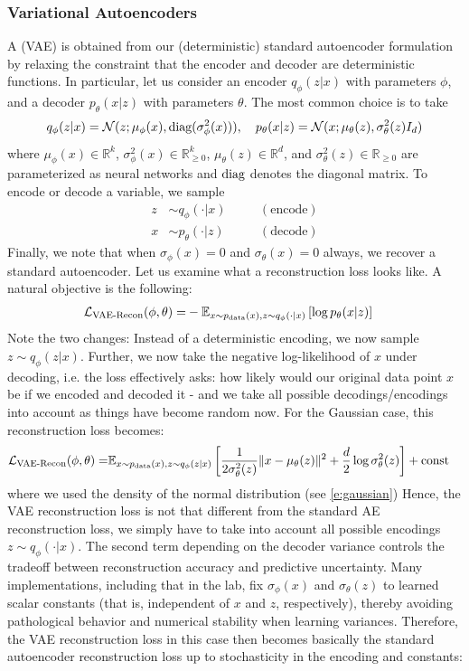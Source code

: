 \subsubsection{Variational Autoencoders} A  (VAE) is obtained from our (deterministic) standard autoencoder formulation by relaxing the constraint that the encoder and decoder are deterministic functions. In particular, let us consider an encoder $q_\phi(z|x)$ with parameters $\phi$, and a decoder $p_\theta(x|z)$ with parameters $\theta$. The most common choice is to take 
\begin{align}
\label{eq:normal_vae}
q_\phi(z|x)=\mathcal{N}(z;\mu_\phi(x),\textrm{diag}(\sigma_\phi^2(x))),\quad p_\theta(x|z)=\mathcal{N}(x;\mu_\theta(z),\sigma_\theta^2(z)I_d)
\end{align}
where $\mu_\phi(x)\in \mathbb{R}^k$, $\sigma_\phi^2(x)\in\mathbb{R}_{\geq 0}^k$, $\mu_\theta(z)\in \mathbb{R}^d$, and $\sigma_\theta^2(z)\in\mathbb{R}_{\geq 0}$ are parameterized as neural networks and $\textrm{diag}$ denotes the diagonal matrix. To encode or decode a variable, we sample 
\begin{align*}
z &\sim q_\phi(\cdot|x) &\quad& (\text{encode}) \\
x &\sim p_\theta(\cdot|z) &\quad& (\text{decode})
\end{align*}
Finally, we note that when $\sigma_\phi(x) = 0$ and $\sigma_\theta(x) = 0$ always, we recover a standard autoencoder. Let us examine what a reconstruction loss looks like. A natural objective is the following:
\begin{align}
\mathcal{L}_{\text{VAE-Recon}}(\phi,\theta)=&-\mathbb{E}_{x \sim p_{\rm{data}}(x),z\sim q_\phi(\cdot|x)} \left[\log p_\theta(x|z)\right]
\end{align}
Note the two changes: Instead of a deterministic encoding, we now sample $z\sim q_\phi(z|x)$. Further, we now take the negative log-likelihood of $x$ under decoding, i.e. the loss effectively asks: how likely would our original data point $x$ be if we  encoded and decoded it - and we take all possible decodings/encodings into account as things have become random now. For the Gaussian case, this reconstruction loss becomes:
\begin{align}
\mathcal{L}_{\text{VAE-Recon}}(\phi,\theta)=&\mathbb{E}_{x \sim p_{\rm{data}}(x),z\sim q_\phi(z|x)} \left[\frac{1}{2\sigma^2_\theta(z)}\|x-\mu_\theta(z)\|^2+\frac{d}{2}\log \sigma_{\theta}^2(z)\right]+\text{const}
\end{align}
where we used the density of the normal distribution (see \cref{e:gaussian}) Hence, the VAE reconstruction loss is not that different from the standard AE reconstruction loss, we simply have to take into account all possible encodings $z\sim q_\phi(\cdot|x)$. The second term depending on the decoder variance controls the tradeoff between reconstruction accuracy and predictive uncertainty. Many implementations, including that in the lab, fix $\sigma_\phi(x)$ and $\sigma_\theta(z)$ to learned scalar constants (that is, independent of $x$ and $z$, respectively), thereby avoiding pathological behavior and numerical stability when learning variances. Therefore, the VAE reconstruction loss in this case then becomes basically the standard autoencoder reconstruction loss up to stochasticity in the encoding and constants:
